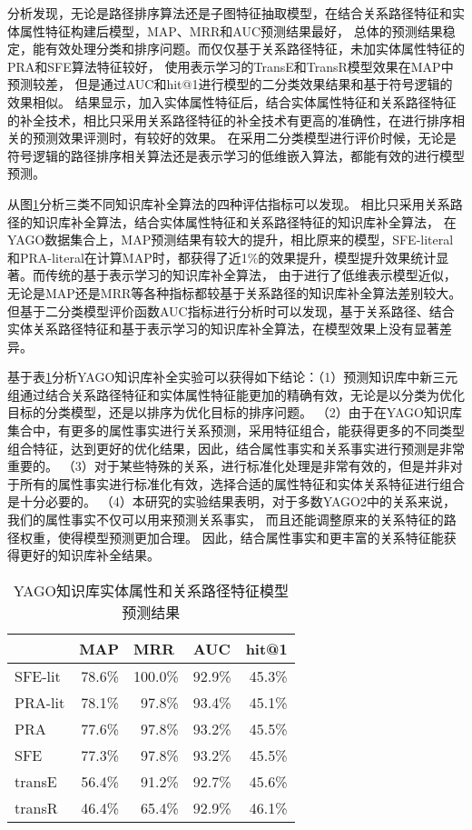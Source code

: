分析发现，无论是路径排序算法还是子图特征抽取模型，在结合关系路径特征和实体属性特征构建后模型，MAP、MRR和AUC预测结果最好，
总体的预测结果稳定，能有效处理分类和排序问题。而仅仅基于关系路径特征，未加实体属性特征的PRA和SFE算法特征较好，
使用表示学习的TransE和TransR模型效果在MAP中预测较差，
但是通过AUC和hit@1进行模型的二分类效果结果和基于符号逻辑的效果相似。
结果显示，加入实体属性特征后，结合实体属性特征和关系路径特征的补全技术，相比只采用关系路径特征的补全技术有更高的准确性，在进行排序相关的预测效果评测时，有较好的效果。
在采用二分类模型进行评价时候，无论是符号逻辑的路径排序相关算法还是表示学习的低维嵌入算法，都能有效的进行模型预测。

从图\ref{tab:kbc-yago-literal}分析三类不同知识库补全算法的四种评估指标可以发现。
相比只采用关系路径的知识库补全算法，结合实体属性特征和关系路径特征的知识库补全算法，
在YAGO数据集合上，MAP预测结果有较大的提升，相比原来的模型，SFE-literal和PRA-literal在计算MAP时，都获得了近1\%的效果提升，模型提升效果统计显著。而传统的基于表示学习的知识库补全算法，
由于进行了低维表示模型近似，无论是MAP还是MRR等各种指标都较基于关系路径的知识库补全算法差别较大。但基于二分类模型评价函数AUC指标进行分析时可以发现，基于关系路径、结合实体关系路径特征和基于表示学习的知识库补全算法，在模型效果上没有显著差异。

基于表\ref{tab:kbc-yago-literal}分析YAGO知识库补全实验可以获得如下结论：（1）预测知识库中新三元组通过结合关系路径特征和实体属性特征能更加的精确有效，无论是以分类为优化目标的分类模型，还是以排序为优化目标的排序问题。
（2）由于在YAGO知识库集合中，有更多的属性事实进行关系预测，采用特征组合，能获得更多的不同类型组合特征，达到更好的优化结果，因此，结合属性事实和关系事实进行预测是非常重要的。
（3）对于某些特殊的关系，进行标准化处理是非常有效的，但是并非对于所有的属性事实进行标准化有效，选择合适的属性特征和实体关系特征进行组合是十分必要的。
（4）本研究的实验结果表明，对于多数YAGO2中的关系来说，我们的属性事实不仅可以用来预测关系事实，
而且还能调整原来的关系特征的路径权重，使得模型预测更加合理。
因此，结合属性事实和更丰富的关系特征能获得更好的知识库补全结果。
\begin{table}[htbp]
  \centering
  \caption{YAGO知识库实体属性和关系路径特征模型预测结果}
    \begin{tabular}{|l|r|r|r|r|}
    \hline
          & \multicolumn{1}{l|}{MAP} & \multicolumn{1}{l|}{MRR} & \multicolumn{1}{l|}{AUC} & \multicolumn{1}{l|}{hit@1} \\
    \hline
    SFE-lit & 78.6\% & 100.0\% & 92.9\% & 45.3\% \\
    \hline
    PRA-lit & 78.1\% & 97.8\% & 93.4\% & 45.1\% \\
    \hline
    PRA   & 77.6\% & 97.8\% & 93.2\% & 45.5\% \\
    \hline
    SFE   & 77.3\% & 97.8\% & 93.2\% & 45.5\% \\
    \hline
    transE & 56.4\% & 91.2\% & 92.7\% & 45.6\% \\
    \hline
    transR & 46.4\% & 65.4\% & 92.9\% & 46.1\% \\
    \hline
    \end{tabular}%
  \label{tab:kbc-yago-literal}%
\end{table}%


